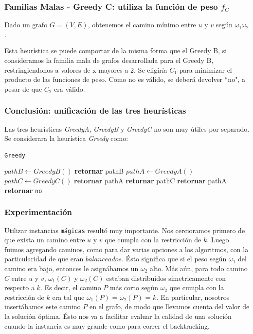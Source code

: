 \clearpage
\subsubsection{Familias Malas - Greedy C: utiliza la función de peso $f_{C}$}\label{subsubsec:greedy-c}
Dado un grafo $G = (V,E)$, obtenemos el camino m\'inimo entre $u$ y $v$ seg\'un $\omega_1\omega_2$. 

Esta heurística se puede comportar de la misma forma que el Greedy B, si consideramos la familia mala de grafos desarrollada para el Greedy B,
restringiendonos a valores de x mayores a 2. Se eligiría $C_1$  para minimizar el producto de las funciones de peso. Como no es válido,
se deberá devolver ``no", a pesar de que $C_2$ era válido. 

\subsubsection{Conclusión: unificación de las tres heurísticas}
Las tres heurísticas \textit{GreedyA}, \textit{GreedyB} y \textit{GreedyC} no son muy útiles por separado. Se considerara la heurística \textit{Greedy} como:

\begin{algorithm}
    \caption{\texttt{Greedy}}
\begin{algorithmic}[1]
    \State $pathB \leftarrow GreedyB()$
        \State \textbf{retornar} pathB
    \EndIf
    \State $pathA \leftarrow GreedyA()$
    \State $pathC \leftarrow GreedyC()$
            \State \textbf{retornar} pathA
        \Else
            \State \textbf{retornar} pathC
        \EndIf
    \EndIf
        \State \textbf{retornar} pathA
    \Else
        \State \textbf{retornar} \texttt{no}
    \EndIf
\end{algorithmic}
\end{algorithm}

\subsubsection{Experimentación}
Utilizar instancias \texttt{mágicas} resultó muy importante. Nos cercioramos primero de que exista un camino entre $u$ y
$v$ que cumpla con la restricción de $k$. Luego fuimos agregando caminos, como para dar varias opciones a los algoritmos, con la particularidad
de que eran $balanceados$. Ésto significa que si el peso según $\omega_1$ del camino era bajo, entonces le asignábamos un $\omega_2$ alto.
Más aún, para todo camino $C$ entre $u$ y $v$, $\omega_1(C)$ y $\omega_2(C)$ estaban distribuidos simetricamente con respecto a $k$.
Es decir, el camino $P$ más corto según $\omega_2$ que cumpla con la restricción de $k$ era tal que $\omega_1(P)$ = $\omega_2(P)$ = $k$.
En particular, nosotros insertábamos este camino $P$ en el grafo, de modo que llevamos cuenta del valor de la solución óptima. Ésto nos va a
facilitar evaluar la calidad de una solución cuando la instancia es muy grande como para correr el backtracking.


